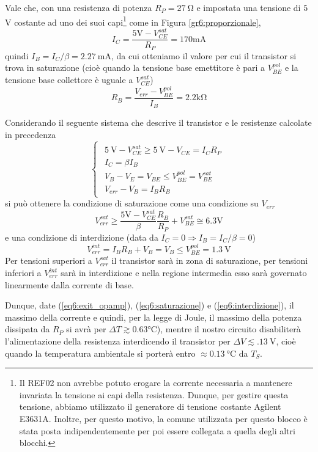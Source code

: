 Vale che, con una resistenza di potenza $R_{P} = \SI{27}{\ohm}$ e impostata una tensione di $5$ \si{\volt} costante ad uno dei suoi capi\footnote{Il REF02 non avrebbe potuto erogare la corrente necessaria a mantenere invariata la tensione ai capi della resistenza.
Dunque, per gestire questa tensione, abbiamo utilizzato il generatore di tensione costante Agilent E3631A.
Inoltre, per questo motivo, la comune utilizzata per questo blocco è stata posta indipendentemente per poi essere collegata a quella degli altri blocchi.} come in Figura \ref{gr6:proporzionale},
$$I_{C}=\frac{5 \si{\volt}- V_{CE}^{sat}}{R_P}=170 \si{\milli\ampere}$$
quindi $I_B=I_{C}/\beta=\SI{2.27}{\mA}$, da cui otteniamo il valore per cui il transistor si trova in saturazione (cioè quando la tensione base emettitore è pari a $V_{BE}^{pol}$ e la tensione base collettore è uguale a $V_{CE}^{sat}$)
$$R_B=\frac{V_{err} - V_{BE}^{pol}}{I_B}=2.2 \si{\kilo\ohm}$$

Considerando il seguente sistema che descrive il transistor e le resistenze calcolate in precedenza
$$
\begin{cases}
\begin{array}{rl}
\SI{5}{\volt}-V_{CE}^{sat} \geq \SI{5}{\volt}-V_{CE} = I_{C}R_P\\
I_C=\beta I_B \\
V_B - V_E = V_{BE} \leq V_{BE}^{pol} = V_{BE}^{sat}\\
V_{err}-V_B=I_B R_B
\end{array}
\end{cases}
$$
si può ottenere la condizione di saturazione come una condizione su $V_{err}$
\begin{equation}
V_{err}^{sat} \geq \frac{5\si{\volt}-V_{CE}^{sat}}{\beta} \frac{R_B}{R_P}+V_{BE}^{sat} \cong 6.3 \si{\volt}
\label{eq6:saturazione}
\end{equation}
e una condizione di interdizione (data da $I_C = 0 \Rightarrow I_B = I_C / \beta = 0$)
\begin{equation}
V_{err}^{int} = I_B R_B + V_B = V_B \leq V_{BE}^{pol} = \SI{1.3}{\V}
\label{eq6:interdizione}
\end{equation}
Per tensioni superiori a $V_{err}^{sat}$ il transistor sarà in zona di saturazione, per tensioni inferiori a $V_{err}^{int}$ sarà in interdizione e nella regione intermedia esso sarà governato linearmente dalla corrente di base.

Dunque, date (\ref{eq6:exit_opamp}), (\ref{eq6:saturazione}) e (\ref{eq6:interdizione}), il massimo della corrente e quindi, per la legge di Joule, il massimo della potenza dissipata da $R_P$ si avrà per $\Delta T \gtrsim 0.63 \si{\celsius}$), mentre il nostro circuito disabiliterà l'alimentazione della resistenza interdicendo il transistor per $\Delta V \lesssim \SI{.13}{\V}$, cioè quando la temperatura ambientale si porterà entro $\approx \SI{0.13}{\celsius}$ da $T_{S}$.


